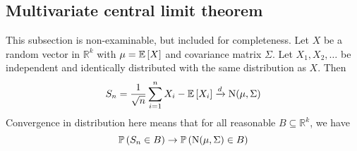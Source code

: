 \subsection{Multivariate central limit theorem}
This subsection is non-examinable, but included for completeness.
Let \(X\) be a random vector in \(\mathbb R^k\) with \(\mu = \mathbb{E}\left[{X}\right]\) and covariance matrix \(\Sigma\).
Let \(X_1, X_2, \dots\) be independent and identically distributed with the same distribution as \(X\).
Then
\[
	S_n = \frac{1}{\sqrt{n}} \sum_{i=1}^n X_i - \mathbb{E}\left[{X_i}\right] \xrightarrow{d} \mathrm{N}(\mu, \Sigma)
\]
Convergence in distribution here means that for all reasonable \(B \subseteq \mathbb R^k\), we have
\[
	\mathbb{P}\left({S_n \in B}\right) \to \mathbb{P}\left({\mathrm{N}(\mu, \Sigma) \in B}\right)
\]

